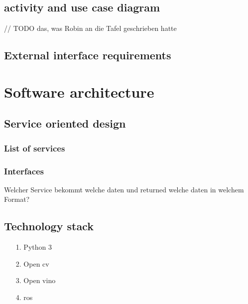 \documentclass[12pt]{book}
\begin{document}
\section{activity and use case diagram}
// TODO das, was Robin an die Tafel geschrieben hatte

\section{External interface requirements}

\chapter{Software architecture}
\section{Service oriented design}
\subsection{List of services}
\subsection{Interfaces}
Welcher Service bekommt welche daten und returned welche daten in welchem Format?

\section{Technology stack}
\begin{itemize}
\item[1.] Python 3
\item[2.] Open cv
\item[3.] Open vino
\item[4.] ros
\end{itemize}
	
\end{document}

